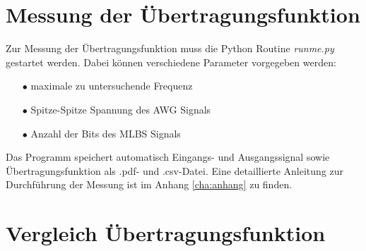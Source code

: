 \documentclass[12pt,report,final,twoside,accentcolor=tud9b,bigchapter]{tudreport}
\begin{document}
\section{Messung der Übertragungsfunktion}
Zur Messung der Übertragungsfunktion muss die Python Routine \textit{runme.py} gestartet werden. Dabei können verschiedene Parameter vorgegeben werden:
\begin{enumerate}
\item[$\bullet$] maximale zu untersuchende Frequenz
\item[$\bullet$] Spitze-Spitze Spannung des AWG Signals
\item[$\bullet$] Anzahl der Bits des MLBS Signals
\end{enumerate}

Das Programm speichert automatisch Eingangs- und Ausgangssignal sowie Übertragungsfunktion als .pdf- und .csv-Datei.
Eine detaillierte Anleitung zur Durchführung der Messung ist im Anhang \ref{cha:anhang} zu finden. 

\section{Vergleich Übertragungsfunktion}
\end{document}
